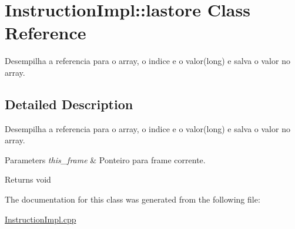 \hypertarget{class_instruction_impl_1_1lastore}{}\section{Instruction\+Impl\+:\+:lastore Class Reference}
\label{class_instruction_impl_1_1lastore}


Desempilha a referencia para o array, o indice e o valor(long) e salva o valor no array.  




\subsection{Detailed Description}
Desempilha a referencia para o array, o indice e o valor(long) e salva o valor no array. 


\begin{DoxyParams}{Parameters}
{\em this\+\_\+frame} & Ponteiro para frame corrente. \\
\hline
\end{DoxyParams}
\begin{DoxyReturn}{Returns}
void 
\end{DoxyReturn}


The documentation for this class was generated from the following file\+:\begin{DoxyCompactItemize}
\item 
\hyperlink{_instruction_impl_8cpp}{Instruction\+Impl.\+cpp}\end{DoxyCompactItemize}
